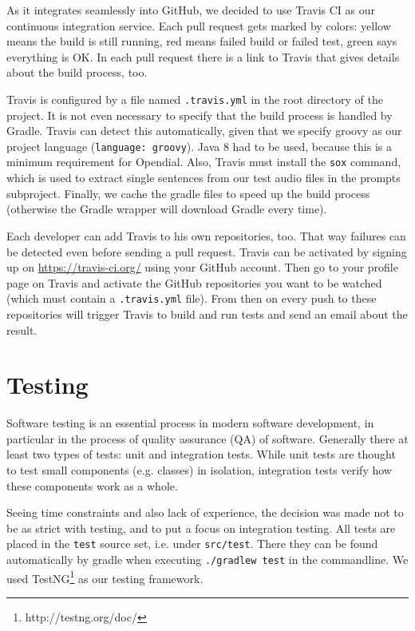 \documentclass[a4paper, 12pt]{article}
\begin{document}
As it integrates seamlessly into GitHub, we decided to use Travis CI as our continuous integration service. Each pull request gets marked by colors: yellow means the build is still running, red means failed build or failed test, green says everything is OK. In each pull request there is a link to Travis that gives details about the build process, too.

Travis is configured by a file named \texttt{.travis.yml} in the root directory of the project. 
It is not even necessary to specify that the build process is handled by Gradle.
Travis can detect this automatically, given that we specify groovy as our project language (\texttt{language: groovy}).
Java 8 had to be used, because this is a minimum requirement for Opendial.
Also, Travis must install the \texttt{sox} command, which is used to extract single sentences from our test audio files in the prompts subproject.
Finally, we cache the gradle files to speed up the build process (otherwise the Gradle wrapper will download Gradle every time).

Each developer can add Travis to his own repositories, too.
That way failures can be detected even before sending a pull request.
Travis can be activated by signing up on \url{https://travis-ci.org/} using your GitHub account.
Then go to your profile page on Travis and activate the GitHub repositories you want to be watched (which must contain a \texttt{.travis.yml} file).
From then on every push to these repositories will trigger Travis to build and run tests and send an email about the result.

\newpage
\section{Testing}
\label{sec:Testing}
Software testing is an essential process in modern software development, in particular in the process of quality assurance (QA) of software.
Generally there at least two types of tests: unit and integration tests.
While unit tests are thought to test small components (e.g. classes) in isolation, integration tests verify how these components work as a whole.

Seeing time constraints and also lack of experience, the decision was made not to be as strict with testing, and to put a focus on integration testing.
All tests are placed in the \texttt{test} source set, i.e. under \texttt{src/test}.
There they can be found automatically by gradle when executing \texttt{./gradlew test} in the commandline.
We used TestNG\footnote{http://testng.org/doc/} as our testing framework.
\end{document}
